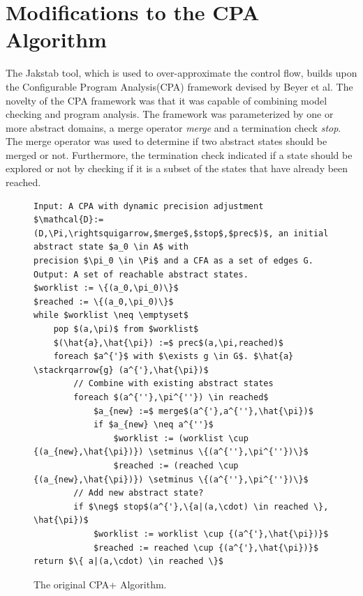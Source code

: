 \documentclass{kththesis}
\newcommand\stackrqarrow[1]{%
    \mathrel{\stackon[2pt]{$\rightsquigarrow$}{$\scriptscriptstyle#1$}}}
\newcommand{\fbcomment}[1]{{#1}}
\renewcommand{\fbcomment}[1]{}
\renewcommand{\it}[1]{\textit{#1}}
\begin{document}
\section{Modifications to the CPA Algorithm}\label{sec:modsToCPA}
\fbcomment{\color{red}Goal: Describe the origin of the CPA Algorithm and why it has morphed into the CPA+ algorithm and Jakstab algorithm. Additionally, explain how and why it was changed in this thesis.}
The Jakstab tool, which is used to over-approximate the control flow, builds upon the Configurable Program Analysis(CPA) framework devised by Beyer et al\cite{cpaAlgo}. The novelty of the CPA framework was that it was capable of combining model checking and program analysis. The framework was parameterized by one or more abstract domains, a merge operator \it{merge} and a termination check \it{stop}. The merge operator was used to determine if two abstract states should be merged or not. Furthermore, the termination check indicated if a state should be explored or not by checking if it is a subset of the states that have already been reached. %
\begin{figure}[thb]
    \centering
\begin{algorithmFrame}
\begin{lstlisting}[style=algorithm]
Input: A CPA with dynamic precision adjustment 
$\mathcal{D}:=(D,\Pi,\rightsquigarrow,$merge$,$stop$,$prec$)$, an initial abstract state $a_0 \in A$ with 
precision $\pi_0 \in \Pi$ and a CFA as a set of edges G.
Output: A set of reachable abstract states.
$worklist := \{(a_0,\pi_0)\}$
$reached := \{(a_0,\pi_0)\}$
while $worklist \neq \emptyset$
    pop $(a,\pi)$ from $worklist$
    $(\hat{a},\hat{\pi}) :=$ prec$(a,\pi,reached)$
    foreach $a^{'}$ with $\exists g \in G$. $\hat{a} \stackrqarrow{g} (a^{'},\hat{\pi})$
        // Combine with existing abstract states
        foreach $(a^{''},\pi^{''}) \in reached$
            $a_{new} :=$ merge$(a^{'},a^{''},\hat{\pi})$
            if $a_{new} \neq a^{''}$
                $worklist := (worklist \cup {(a_{new},\hat{\pi})}) \setminus \{(a^{''},\pi^{''})\}$
                $reached := (reached \cup {(a_{new},\hat{\pi})}) \setminus \{(a^{''},\pi^{''})\}$
        // Add new abstract state?
        if $\neg$ stop$(a^{'},\{a|(a,\cdot) \in reached \}, \hat{\pi})$
            $worklist := worklist \cup {(a^{'},\hat{\pi})}$
            $reached := reached \cup {(a^{'},\hat{\pi})}$
return $\{ a|(a,\cdot) \in reached \}$
\end{lstlisting}
\end{algorithmFrame}
\caption[The original CPA+ Algorithm.]{The original CPA+ Algorithm.}
    \label{fig:CPAOrig}
\end{figure}
\end{document}
